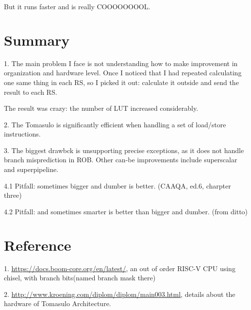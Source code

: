 \documentclass[12pt,letterpaper]{article}
\begin{document}
    But it runs faster and is really COOOOOOOOL. 
\section{Summary}
    1. The main problem I face is not understanding how to make improvement in organization and hardware level. 
    Once I noticed that I had repeated calculating one same thing in each RS, so I picked it out: 
    calculate it outside and send the result to each RS. 

    The result was crazy: the number of LUT increased considerably. 

    2. The Tomasulo is significantly efficient when handling a set of load/store instructions. 

    3. The biggest drawbck is unsupporting precise exceptions, as it does not handle branch misprediction in ROB. 
    Other can-be improvements include superscalar and superpipeline. 

    4.1 Pitfall: sometimes bigger and dumber is better. (CAAQA, ed.6, charpter three)

    4.2 Pitfall: and sometimes smarter is better than bigger and dumber. (from ditto)
\section{Reference}
1. \url{https://docs.boom-core.org/en/latest/}, an out of order RISC-V CPU using chisel, with branch bits(named branch mask there)

2. \url{http://www.kroening.com/diplom/diplom/main003.html}, details about the hardware of Tomasulo Architecture.
\end{document}
